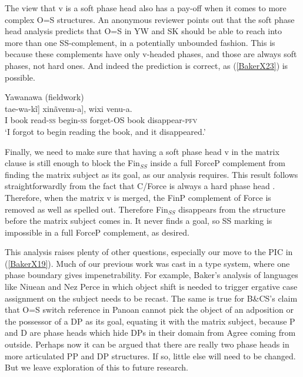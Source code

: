 \documentclass[output=paper]{langscibook}
\begin{document}
The view that v is a soft phase head also has a pay-off when it comes to more complex O=S structures. An anonymous reviewer points out that the soft phase head analysis predicts that O=S in YW and SK should be able to reach into more than one SS-complement, in a potentially unbounded fashion. This is because these complements have only v-headed phases, and those are always soft phases, not hard ones. And indeed the prediction is correct, as (\ref{BakerX23}) is possible.

\begin{exe}
    \ex Yawanawa (fieldwork) \label{BakerX23}\\
			\gll [Ẽ [[wixi ane-kĩ] tae-wa-kĩ] xinãvenu-a], wixi venu-a.\\
			    I book read-\textsc{ss} begin-\textsc{ss} forget-\textsc{OS} book disappear-\textsc{pfv}\\
			\glt `I forgot to begin reading the book, and it disappeared.'
\end{exe}

Finally, we need to make sure that having a soft phase head v in the matrix clause is still enough to block the Fin$_{SS}$ inside a full ForceP complement from finding the matrix subject as its goal, as our analysis requires. This result follows straightforwardly from the fact that C/Force is always a hard phase head \citep[149]{baker2015case}. Therefore, when the matrix v is merged, the FinP complement of Force is removed as well as spelled out. Therefore Fin$_{SS}$ disappears from the structure before the matrix subject comes in. It never finds a goal, so SS marking is impossible in a full ForceP complement, as desired.

This analysis raises plenty of other questions, especially our move to the PIC in (\ref{BakerX19}). Much of our previous work was cast in a \citet{chomsky2000minimalist} type system, where one phase boundary gives impenetrability. For example, Baker’s \citeyearpar{baker2015case} analysis of languages like Niuean and Nez Perce in which object shift is needed to trigger ergative case assignment on the subject needs to be recast. The same is true for B\&CS’s claim that O=S switch reference in Panoan cannot pick the object of an adposition or the possessor of a DP as its goal, equating it with the matrix subject, because P and D are phase heads which hide DPs in their domain from Agree coming from outside. Perhaps now it can be argued that there are really two phase heads in more articulated PP and DP structures. If so, little else will need to be changed. But we leave exploration of this to future research.
\end{document}
